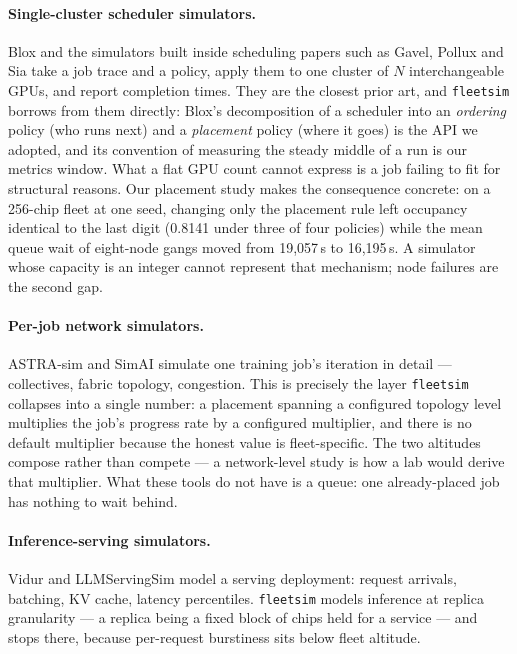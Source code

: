 \paragraph{Single-cluster scheduler simulators.}
Blox \cite{blox2024} and the simulators built inside scheduling papers such as
Gavel, Pollux and Sia take a job trace and a policy, apply them to one cluster
of $N$ interchangeable GPUs, and report completion times. They are the closest
prior art, and \texttt{fleetsim} borrows from them directly: Blox's decomposition
of a scheduler into an \emph{ordering} policy (who runs next) and a
\emph{placement} policy (where it goes) is the API we adopted, and its convention
of measuring the steady middle of a run is our metrics window. What a flat GPU
count cannot express is a job failing to fit for structural reasons. Our
placement study makes the consequence concrete: on a 256-chip fleet at one seed,
changing only the placement rule left occupancy identical to the last digit
(0.8141 under three of four policies) while the mean queue wait of eight-node
gangs moved from 19{,}057\,s to 16{,}195\,s. A simulator whose capacity is an
integer cannot represent that mechanism; node failures are the second gap.

\paragraph{Per-job network simulators.}
ASTRA-sim \cite{astrasim2023} and SimAI \cite{simai2025} simulate one training
job's iteration in detail --- collectives, fabric topology, congestion. This is
precisely the layer \texttt{fleetsim} collapses into a single number: a
placement spanning a configured topology level multiplies the job's progress
rate by a configured multiplier, and there is no default multiplier because the
honest value is fleet-specific. The two altitudes compose rather than compete ---
a network-level study is how a lab would derive that multiplier. What these tools
do not have is a queue: one already-placed job has nothing to wait behind.

\paragraph{Inference-serving simulators.}
Vidur \cite{vidur2024} and LLMServingSim model a serving deployment: request
arrivals, batching, KV cache, latency percentiles. \texttt{fleetsim} models
inference at replica granularity --- a replica being a fixed block of chips held
for a service --- and stops there, because per-request burstiness sits below
fleet altitude.

